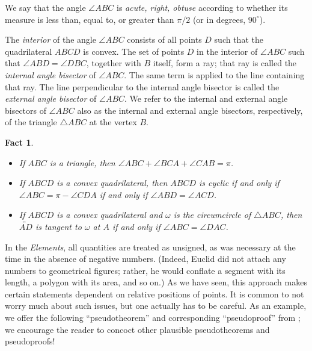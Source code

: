 \documentclass[12pt]{book}
\numberwithin{exc}{section}
\numberwithin{figure}{section}
\newtheorem{fact}[theorem]{Fact}
\numberwithin{equation}{theorem}
\def\ang{\angle}
\def\line#1{\overleftrightarrow{#1}}
\begin{document}
We say that the angle $\ang ABC$ is \emph{acute, right, obtuse} 
 
 
 
according to whether its measure is less than, equal to, or greater than
$\pi/2$ (or in degrees, $90^\circ$).

The \emph{interior}  of the angle $\ang ABC$
consists of all points $D$ such that the quadrilateral $ABCD$ is convex.
The set of points $D$ in the interior of $\ang ABC$ such that $\ang ABD = \ang DBC$,
together with $B$ itself, form a ray; that ray
is called the \emph{internal angle bisector}
 
of $\ang ABC$. The same term is applied to the line containing that ray.
The line perpendicular to the internal angle bisector is called the
\emph{external angle bisector} 
 of $\ang ABC$.
We refer to the internal and external angle bisectors of $\ang ABC$ also as
the internal and external angle bisectors, respectively, of the triangle
$\triangle ABC$ at the vertex $B$.

\begin{fact}
\begin{itemize}
\item
If $ABC$ is a triangle, then $\angle ABC + \angle BCA + \angle CAB = \pi$.
\item
If $ABCD$ is a convex quadrilateral, then
$ABCD$ is cyclic if and only if $\ang ABC = \pi - \ang CDA$
if and only if $\ang ABD = \ang ACD$.
\item
If $ABCD$ is a convex quadrilateral and $\omega$ is the circumcircle of
$\triangle ABC$, then $\line{AD}$ is tangent to $\omega$ at $A$ if and only
if $\ang ABC = \ang DAC$.
\end{itemize}
\end{fact}

In the \emph{Elements}, 
all quantities are treated as unsigned, as
was necessary at the time in the absence of negative numbers. (Indeed,
Euclid 
did not attach any numbers to geometrical figures; rather, he
would conflate a segment with its length, a polygon with its area, and so on.)
As we have seen, this approach makes certain statements dependent on
relative positions of points. It is common to not worry much about such
issues, but one actually has to be careful.
As an example, we offer the following ``pseudotheorem''
 and corresponding ``pseudoproof''
 from \cite{bib:max}; we encourage the reader to concoct other plausible pseudotheorems and pseudoproofs!
\end{document}

